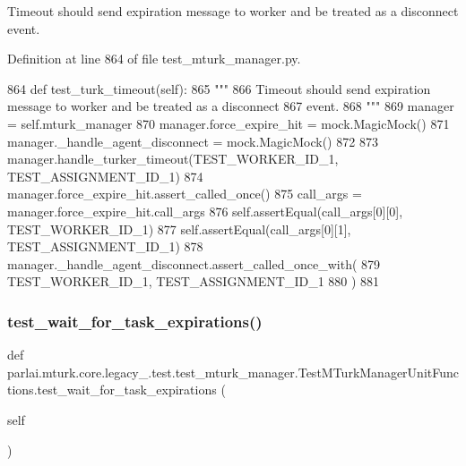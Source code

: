 \begin{DoxyVerb}Timeout should send expiration message to worker and be treated as a disconnect
event.
\end{DoxyVerb}
 

Definition at line 864 of file test\+\_\+mturk\+\_\+manager.\+py.


\begin{DoxyCode}
864     \textcolor{keyword}{def }test\_turk\_timeout(self):
865         \textcolor{stringliteral}{"""}
866 \textcolor{stringliteral}{        Timeout should send expiration message to worker and be treated as a disconnect}
867 \textcolor{stringliteral}{        event.}
868 \textcolor{stringliteral}{        """}
869         manager = self.mturk\_manager
870         manager.force\_expire\_hit = mock.MagicMock()
871         manager.\_handle\_agent\_disconnect = mock.MagicMock()
872 
873         manager.handle\_turker\_timeout(TEST\_WORKER\_ID\_1, TEST\_ASSIGNMENT\_ID\_1)
874         manager.force\_expire\_hit.assert\_called\_once()
875         call\_args = manager.force\_expire\_hit.call\_args
876         self.assertEqual(call\_args[0][0], TEST\_WORKER\_ID\_1)
877         self.assertEqual(call\_args[0][1], TEST\_ASSIGNMENT\_ID\_1)
878         manager.\_handle\_agent\_disconnect.assert\_called\_once\_with(
879             TEST\_WORKER\_ID\_1, TEST\_ASSIGNMENT\_ID\_1
880         )
881 
\end{DoxyCode}
\mbox{\label{classparlai_1_1mturk_1_1core_1_1legacy__2018_1_1test_1_1test__mturk__manager_1_1TestMTurkManagerUnitFunctions_a36a64514bc98c443578e55ab0b01a8b9}} 
\subsubsection{\texorpdfstring{test\+\_\+wait\+\_\+for\+\_\+task\+\_\+expirations()}{test\_wait\_for\_task\_expirations()}}
{\footnotesize\ttfamily def parlai.\+mturk.\+core.\+legacy\+\_.\+test.\+test\+\_\+mturk\+\_\+manager.\+Test\+M\+Turk\+Manager\+Unit\+Functions.\+test\+\_\+wait\+\_\+for\+\_\+task\+\_\+expirations (\begin{DoxyParamCaption}\item[{}]{self }\end{DoxyParamCaption})}

